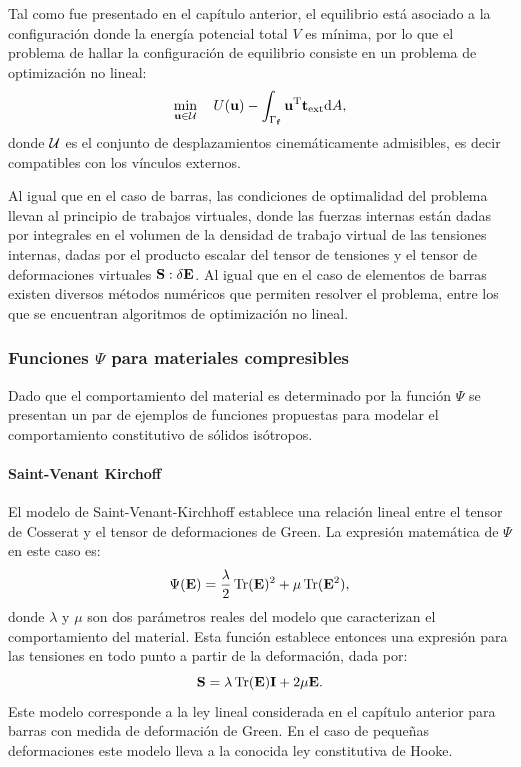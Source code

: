 Tal como fue presentado en el capítulo anterior, el equilibrio está asociado a la configuración donde la energía potencial total $V$ es mínima, por lo que el problema de hallar la configuración de equilibrio consiste en un problema de optimización no lineal: %
%
%
\begin{equation}\label{eqn:prelim_minetot}
\min_{{\bf u} \in {\mathcal U}} \quad  U({\bf u}) - \int_{\Gamma_{{\bf f}}} {\bf u}^{\text{T}} {\bf t}_{\text{ext}} {\text{d}} A,
\end{equation}
%
donde ${\mathcal U}$ es el conjunto de desplazamientos cinemáticamente admisibles, es decir compatibles con los vínculos externos. %

Al igual que en el caso de barras, las condiciones de optimalidad del problema llevan al principio de trabajos virtuales, donde las fuerzas internas están dadas por integrales en el volumen de la densidad de trabajo virtual de las tensiones internas, dadas por el producto escalar del tensor de tensiones y el tensor de deformaciones virtuales ${\bf S}:\delta{\bf E}$. %
%
Al igual que en el caso de elementos de barras existen diversos métodos numéricos que permiten resolver el problema, entre los que se encuentran algoritmos de optimización no lineal.



\subsubsection{Funciones $\Psi$ para materiales compresibles}
%
Dado que el comportamiento del material es determinado por la función $\Psi$ se presentan un par de ejemplos de funciones propuestas para modelar el comportamiento constitutivo de sólidos isótropos. %

%
\paragraph{Saint-Venant Kirchoff}
El modelo de Saint-Venant-Kirchhoff establece una relación lineal entre el tensor de Cosserat y el tensor de deformaciones de Green. La expresión matemática de $\Psi$ en este caso es:
%
\begin{equation}
\Psi ({\bf E}) = \frac{\lambda}{2} \operatorname{\text{Tr}}({\bf E})^2 + \mu \operatorname{\text{Tr}}({\bf E}^2),
\end{equation}
%
donde $\lambda$ y $\mu$ son dos parámetros reales del modelo que caracterizan el comportamiento del material. %
%
Esta función establece entonces una expresión para las tensiones en todo punto a partir de la deformación, dada por:
%
\begin{equation}\label{eqn:eqconssvk}
{\bf S} = \lambda \operatorname{\text{Tr}}({\bf E}) {\bf I} + 2 \mu {\bf E} .
\end{equation}
%
Este modelo corresponde a la ley lineal considerada en el capítulo anterior para barras con medida de deformación de Green. %
%
En el caso de pequeñas deformaciones este modelo lleva a la conocida ley constitutiva de Hooke.


